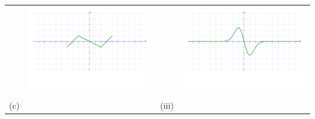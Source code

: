 \documentclass[12pt]{article}
\begin{document}
\begin{enumerate}
\begin{center}
\begin{tabular}{cc|cc}
&\includegraphics[scale=0.22]{match2.pdf} & &\includegraphics[scale=0.22]{matchc.pdf}\\
(c) && (iii)&\\

\end{tabular}
\end{center}
\end{enumerate}
\end{document}
